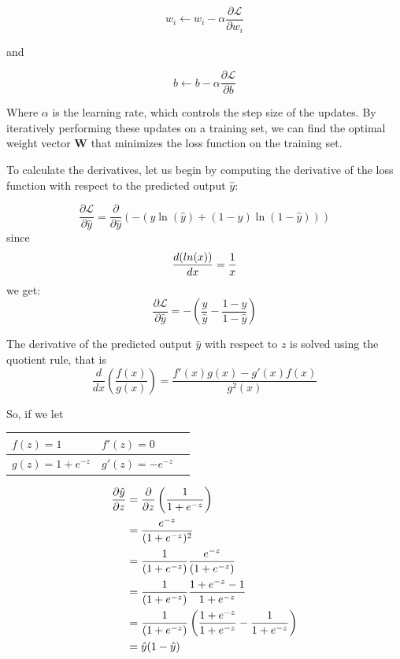 \documentclass[conference]{IEEEtran}
\begin{document}
	
	\begin{equation}
		w_i \leftarrow w_i - \alpha \frac{\partial \mathcal{L}}{\partial w_i}
	\end{equation}
	
	and
	
	\begin{equation}
		b \leftarrow b - \alpha \frac{\partial \mathcal{L}}{\partial b}
	\end{equation}
	
	
	Where $\alpha$ is the learning rate, which controls the step size of the updates. By iteratively performing these updates on a training set, we can find the optimal weight vector $\textbf{W}$ that minimizes the loss function on the training set.
	
	\bigskip
	
	To calculate the derivatives, let us begin by computing the derivative of the loss function with respect to the predicted output $\hat{y}$:
	
	
	$$
	\frac{\partial \mathcal{L}}{\partial\hat{y}} = 
	\frac{\partial}{\partial\hat{y}} 
	\left(  
	-\left(y\ln(\hat{y}) + (1-y)\ln(1-\hat{y})\right)
	\right) 
	$$
	since 
	$$\frac{d \space (ln (x))}{dx}  = \frac{1}{x}$$we get:
	$$\frac{\partial \mathcal{L}}{\partial \hat{y}} = - \left( \frac{y}{\hat{y}} - \frac{1-y}{1-\hat{y}} \right) $$
	
	The derivative of the predicted output $\hat{y}$ with respect to $z$ is solved using the quotient rule, that is 
	$$
	\frac{d}{dx} \left( \frac{f(x)}{g(x)} \right) = \frac{f'(x)g(x) - g'(x)f(x)}{g^2(x)}
	$$
	
	So, if we let
	
	\begin{table}[!ht]
		\centering
		\begin{tabular}{|l|l|l|}
			\hline
			$f(z) = 1$ & $f'(z) = 0$ \\ \hline
			$g(z)=1 +e^{-z}$ & $g'(z)= -e^{-z}$ \\ \hline
			\end{tabular}
	\end{table}

		
	\begin{align*}
		\frac{\partial\hat{y}}{\partial z} 
		& = \frac{\partial}{\partial z} \left( \frac{1}{1 + e^{-z}} \right) \\
		& = \frac{e^{-z}}{(1 + e^{-z})^2} \\
		& = \frac{1}{(1 + e^{-z})} \space \frac{e^{-z}}{(1 + e^{-z})} \\
		& = \frac{1}{(1 + e^{-z})} \space \frac{1 + e^{-z} -1}{1 + e^{-z}} \\
		& = \frac{1}{(1 + e^{-z})} \space \left( \frac{1 + e^{-z}}{1 + e^{-z}} - \frac{1}{1 + e^{-z}} \right)\\
		& = \hat{y}(1-\hat{y})\\
	\end{align*}
	
\end{document}
